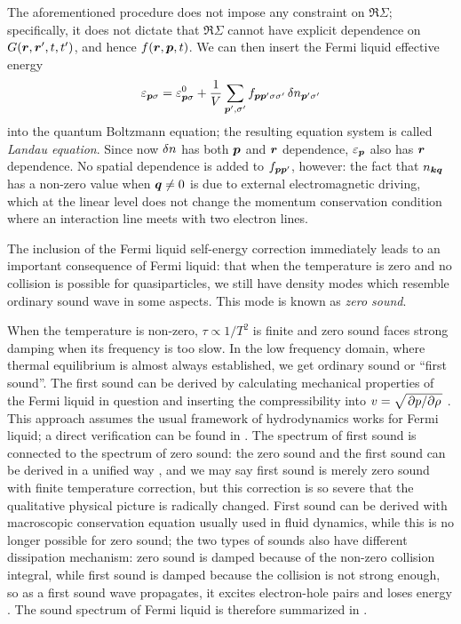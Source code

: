 \documentclass[hyperref, a4paper]{article}
\newcommand*{\term}[1]{\textit{#1}}
\begin{document}
The aforementioned procedure 
does not impose any constraint on $\Re \Sigma$;
specifically, it does not dictate that $\Re \Sigma$
cannot have explicit dependence on $G(\vb*{r}, \vb*{r}', t, t')$, 
and hence $f(\vb*{r}, \vb*{p}, t)$.
We can then insert the Fermi liquid effective energy
\begin{equation}
    \varepsilon_{\vb*{p} \sigma} = \varepsilon^0_{\vb*{p} \sigma} + 
    \frac{1}{V} \sum_{\vb*{p}', \sigma'} f_{\vb*{p} \vb*{p}' \sigma \sigma'} \var{n}_{\vb*{p}' \sigma'}
    \label{eq:landau-eq-assumption}
\end{equation}
into the quantum Boltzmann equation;
the resulting equation system is called \term{Landau equation}.
Since now $\var{n}$ has both $\vb*{p}$ and $\vb*{r}$ dependence,
$\varepsilon_{\vb*{p}}$ also has $\vb*{r}$ dependence.
No spatial dependence is added to $f_{\vb*{p} \vb*{p}'}$, however:
the fact that $n_{\vb*{k} \vb*{q}}$ has a non-zero value when $\vb*{q} \neq 0$
is due to external electromagnetic driving, 
which at the linear level does not change
the momentum conservation condition 
where an interaction line meets with two electron lines.

The inclusion of the Fermi liquid self-energy correction 
immediately leads to an important consequence 
of Fermi liquid: 
that when the temperature is zero and 
no collision is possible for quasiparticles, 
we still have density modes which resemble 
ordinary sound wave in some aspects. 
This mode is known as \emph{zero sound}.

When the temperature is non-zero,
$\tau \propto 1 / T^2$ is finite 
and zero sound faces strong damping 
when its frequency is too slow.
In the low frequency domain, 
where thermal equilibrium is almost always established,
we get ordinary sound or ``first sound''.
The first sound can be derived 
by calculating mechanical properties of the Fermi liquid in question 
and inserting the compressibility 
into $v = \sqrt{\pdv*{p}{\rho}}$ \cite{lifshitz2013statistical}.
This approach assumes the usual framework of hydrodynamics 
works for Fermi liquid; 
a direct verification can be found in \cite{belitz2022soft}.
The spectrum of first sound 
is connected to the spectrum of zero sound:
the zero sound and the first sound can be derived 
in a unified way \cite{khalatnikov1958dispersion},
and we may say first sound is 
merely zero sound with finite temperature correction, 
but this correction is so severe that the qualitative physical picture 
is radically changed.
First sound can be derived with macroscopic conservation equation 
usually used in fluid dynamics,
while this is no longer possible for zero sound;
the two types of sounds also have different dissipation mechanism:
zero sound is damped because of the non-zero collision integral,
while first sound is damped because the collision is not strong enough,
so as a first sound wave propagates,
it excites electron-hole pairs 
and loses energy
\cite{abel1966propagation,belitz2022soft}. 
The sound spectrum of Fermi liquid is therefore summarized in .
\end{document}
